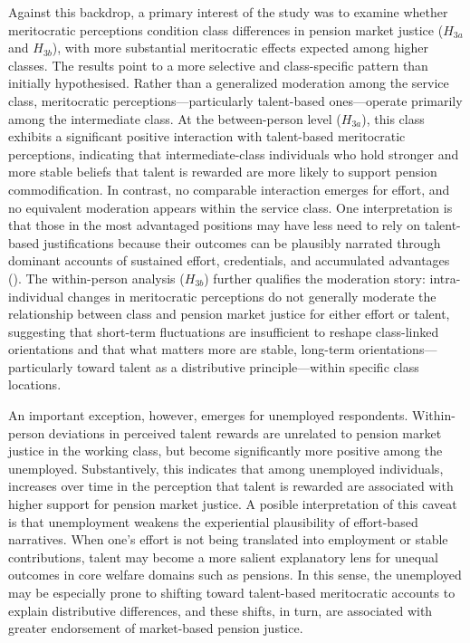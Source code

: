\documentclass[
  12pt,
]{article}
\begin{document}
Against this backdrop, a primary interest of the study was to examine
whether meritocratic perceptions condition class differences in pension
market justice (\(H_{3a}\) and \(H_{3b}\)), with more substantial
meritocratic effects expected among higher classes. The results point to
a more selective and class-specific pattern than initially hypothesised.
Rather than a generalized moderation among the service class,
meritocratic perceptions---particularly talent-based ones---operate
primarily among the intermediate class. At the between-person level
(\(H_{3a}\)), this class exhibits a significant positive interaction
with talent-based meritocratic perceptions, indicating that
intermediate-class individuals who hold stronger and more stable beliefs
that talent is rewarded are more likely to support pension
commodification. In contrast, no comparable interaction emerges for
effort, and no equivalent moderation appears within the service class.
One interpretation is that those in the most advantaged positions may
have less need to rely on talent-based justifications because their
outcomes can be plausibly narrated through dominant accounts of
sustained effort, credentials, and accumulated advantages
(). The
within-person analysis (\(H_{3b}\)) further qualifies the moderation
story: intra-individual changes in meritocratic perceptions do not
generally moderate the relationship between class and pension market
justice for either effort or talent, suggesting that short-term
fluctuations are insufficient to reshape class-linked orientations and
that what matters more are stable, long-term orientations---particularly
toward talent as a distributive principle---within specific class
locations.

An important exception, however, emerges for unemployed respondents.
Within-person deviations in perceived talent rewards are unrelated to
pension market justice in the working class, but become significantly
more positive among the unemployed. Substantively, this indicates that
among unemployed individuals, increases over time in the perception that
talent is rewarded are associated with higher support for pension market
justice. A posible interpretation of this caveat is that unemployment
weakens the experiential plausibility of effort-based narratives. When
one's effort is not being translated into employment or stable
contributions, talent may become a more salient explanatory lens for
unequal outcomes in core welfare domains such as pensions. In this
sense, the unemployed may be especially prone to shifting toward
talent-based meritocratic accounts to explain distributive differences,
and these shifts, in turn, are associated with greater endorsement of
market-based pension justice.
\end{document}
